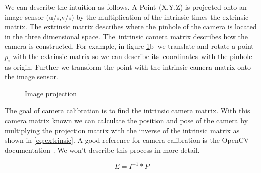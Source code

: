 \documentclass[11pt,a4paper,titlepage,oneside]{report}
\begin{document}
We can describe the intuition as follows. A Point (X,Y,Z) is projected onto an image sensor (u/s,v/s) by the multiplication of the intrinsic times the extrinsic matrix. The extrinsic matrix describes where the pinhole of the camera is located in the three dimensional space. The intrinsic camera matrix describes how the camera is constructed. For example, in figure \ref{fig:projection}b we translate and rotate a point $p_i$ with the extrinsic matrix so we can describe its coordinates with the pinhole as origin. Further we transform the point with the intrinsic camera matrix onto the image sensor.

\begin{figure}[H]
	\centering
	\caption{Image projection}\label{fig:projection}
\end{figure}

The goal of camera calibration is to find the intrinsic camera matrix. With this camera matrix known we can calculate the position and pose of the camera by multiplying the projection matrix with the inverse of the intrinsic matrix as shown in \ref{eq:extrinsic}. A good reference for camera calibration is the OpenCV documentation \cite{opencv_calib}. We won't describe this process in more detail.

\begin{equation}\label{eq:extrinsic}
	E=I^{-1}*P
\end{equation}
\end{document}
